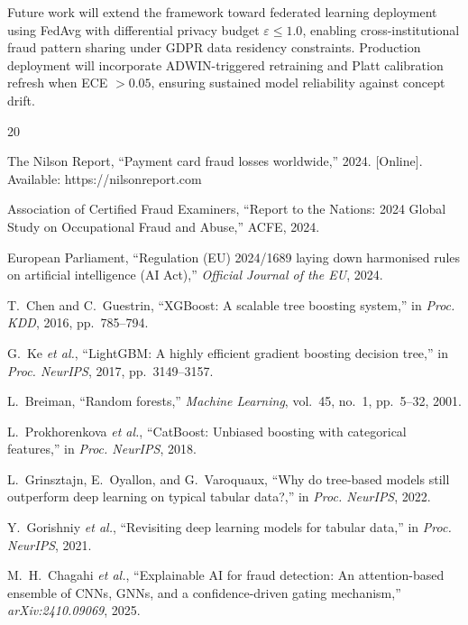 \documentclass[10pt,a4paper,twocolumn]{article}
\begin{document}
Future work will extend the framework toward federated learning deployment using FedAvg with differential privacy budget $\varepsilon \leq 1.0$, enabling cross-institutional fraud pattern sharing under GDPR data residency constraints. Production deployment will incorporate ADWIN-triggered retraining and Platt calibration refresh when ECE $> 0.05$, ensuring sustained model reliability against concept drift.

\balance
{\small
\begin{thebibliography}{20}

The Nilson Report, ``Payment card fraud losses worldwide,'' 2024. [Online]. Available: https://nilsonreport.com

Association of Certified Fraud Examiners, ``Report to the Nations: 2024 Global Study on Occupational Fraud and Abuse,'' ACFE, 2024.

European Parliament, ``Regulation (EU) 2024/1689 laying down harmonised rules on artificial intelligence (AI Act),'' \textit{Official Journal of the EU}, 2024.

T.~Chen and C.~Guestrin, ``XGBoost: A scalable tree boosting system,'' in \textit{Proc. KDD}, 2016, pp.~785--794.

G.~Ke \textit{et al.}, ``LightGBM: A highly efficient gradient boosting decision tree,'' in \textit{Proc. NeurIPS}, 2017, pp.~3149--3157.

L.~Breiman, ``Random forests,'' \textit{Machine Learning}, vol.~45, no.~1, pp.~5--32, 2001.

L.~Prokhorenkova \textit{et al.}, ``CatBoost: Unbiased boosting with categorical features,'' in \textit{Proc. NeurIPS}, 2018.

L.~Grinsztajn, E.~Oyallon, and G.~Varoquaux, ``Why do tree-based models still outperform deep learning on typical tabular data?,'' in \textit{Proc. NeurIPS}, 2022.

Y.~Gorishniy \textit{et al.}, ``Revisiting deep learning models for tabular data,'' in \textit{Proc. NeurIPS}, 2021.


M.~H.~Chagahi \textit{et al.}, ``Explainable AI for fraud detection: An attention-based ensemble of CNNs, GNNs, and a confidence-driven gating mechanism,'' \textit{arXiv:2410.09069}, 2025.


\end{thebibliography}}
\end{document}
